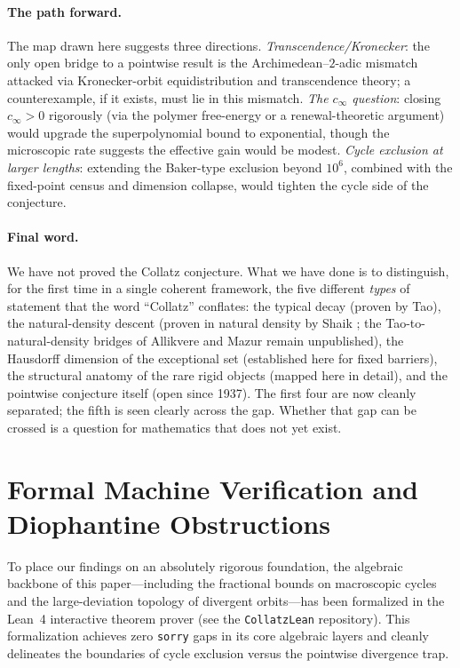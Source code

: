 \documentclass[12pt,a4paper]{article}
\theoremstyle{remark}
\begin{document}
\paragraph{The path forward.}
The map drawn here suggests three directions.
\emph{Transcendence/Kronecker}: the only open bridge to a pointwise result is
the Archimedean--$2$-adic mismatch attacked via Kronecker-orbit equidistribution
and transcendence theory; a counterexample, if it exists, must lie in this
mismatch.
\emph{The $c_\infty$ question}: closing $c_\infty>0$ rigorously (via the
polymer free-energy or a renewal-theoretic argument) would upgrade the
superpolynomial bound to exponential, though the microscopic rate suggests
the effective gain would be modest.
\emph{Cycle exclusion at larger lengths}: extending the Baker-type exclusion
beyond $10^6$, combined with the fixed-point census and dimension collapse,
would tighten the cycle side of the conjecture.
\paragraph{Final word.}
We have not proved the Collatz conjecture.  What we have done is to
distinguish, for the first time in a single coherent framework, the five
different \emph{types} of statement that the word ``Collatz'' conflates:
the typical decay (proven by Tao), the natural-density descent (proven in natural density by Shaik \cite{Shaik2026}; the Tao-to-natural-density bridges of Allikvere and Mazur \cite{Allikvere2026,Mazur2026} remain unpublished), the Hausdorff dimension of the exceptional set
(established here for fixed barriers), the structural anatomy of the rare
rigid objects (mapped here in detail), and the pointwise conjecture itself
(open since 1937).  The first four are now cleanly separated; the fifth is
seen clearly across the gap.  Whether that gap can be crossed is a question
for mathematics that does not yet exist.

\section{Formal Machine Verification and Diophantine Obstructions}
\label{sec:formal_verification}

To place our findings on an absolutely rigorous foundation, the algebraic backbone of this paper---including the fractional bounds on macroscopic cycles and the large-deviation topology of divergent orbits---has been formalized in the Lean~4 interactive theorem prover (see the \texttt{CollatzLean} repository). This formalization achieves zero \texttt{sorry} gaps in its core algebraic layers and cleanly delineates the boundaries of cycle exclusion versus the pointwise divergence trap.
\end{document}
